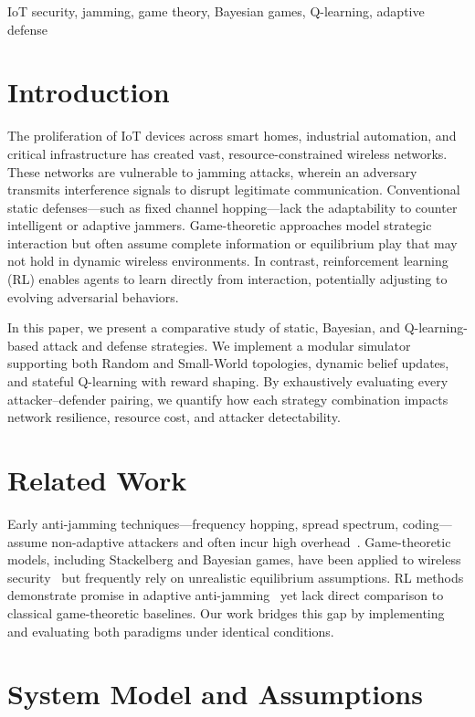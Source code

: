 \documentclass[conference]{IEEEtran}
\begin{document}
\begin{IEEEkeywords}
IoT security, jamming, game theory, Bayesian games, Q-learning, adaptive defense
\end{IEEEkeywords}

\section{Introduction}
The proliferation of IoT devices across smart homes, industrial automation, and critical infrastructure has created vast, resource-constrained wireless networks. These networks are vulnerable to jamming attacks, wherein an adversary transmits interference signals to disrupt legitimate communication. Conventional static defenses—such as fixed channel hopping—lack the adaptability to counter intelligent or adaptive jammers. Game-theoretic approaches model strategic interaction but often assume complete information or equilibrium play that may not hold in dynamic wireless environments. In contrast, reinforcement learning (RL) enables agents to learn directly from interaction, potentially adjusting to evolving adversarial behaviors.

In this paper, we present a comparative study of static, Bayesian, and Q-learning-based attack and defense strategies. We implement a modular simulator supporting both Random and Small-World topologies, dynamic belief updates, and stateful Q-learning with reward shaping. By exhaustively evaluating every attacker–defender pairing, we quantify how each strategy combination impacts network resilience, resource cost, and attacker detectability.

\section{Related Work}
Early anti-jamming techniques—frequency hopping, spread spectrum, coding—assume non-adaptive attackers and often incur high overhead~\cite{Xiao2016}. Game-theoretic models, including Stackelberg and Bayesian games, have been applied to wireless security~\cite{Altman2007} but frequently rely on unrealistic equilibrium assumptions. RL methods demonstrate promise in adaptive anti-jamming~\cite{Zhang2019,Wang2020} yet lack direct comparison to classical game-theoretic baselines. Our work bridges this gap by implementing and evaluating both paradigms under identical conditions.

\section{System Model and Assumptions}
\end{document}
